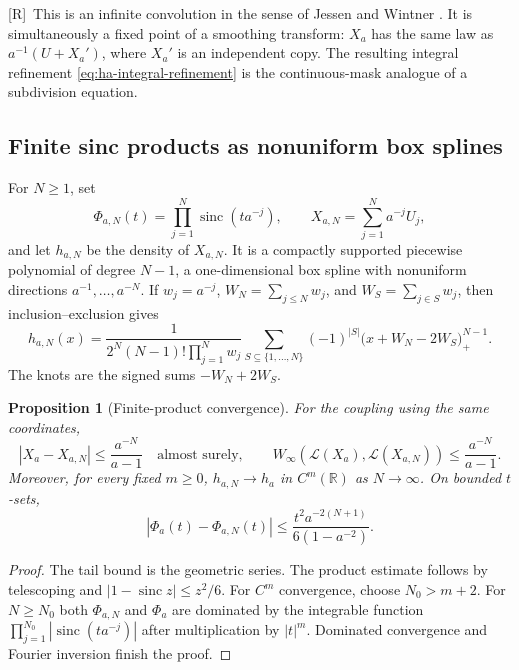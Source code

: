 \documentclass[11pt,oneside]{article}
\newtheorem{proposition}[theorem]{Proposition}
\theoremstyle{definition}
\theoremstyle{remark}
\newcommand{\R}{\mathbb R}
\newcommand{\sinc}{\operatorname{sinc}}
\newcommand{\Wass}{W_{\infty}}
\newcommand{\Rmark}{\textcolor{sourceblue}{\textsf{[R]}}}
\begin{document}
\Rmark\ This is an infinite convolution in the sense of Jessen and Wintner
\cite{jessen1935}.  It is simultaneously a fixed point of a smoothing transform: $X_a$ has
the same law as $a^{-1}(U+X_a')$, where $X_a'$ is an independent copy.  The resulting
integral refinement \eqref{eq:ha-integral-refinement} is the continuous-mask analogue of a
subdivision equation.

\subsection{Finite sinc products as nonuniform box splines}

For $N\ge1$, set
\begin{equation}
 \Phi_{a,N}(t)=\prod_{j=1}^{N}\sinc(ta^{-j}),
 \qquad
 X_{a,N}=\sum_{j=1}^{N}a^{-j}U_j,
 \label{eq:finite-products}
\end{equation}
and let $h_{a,N}$ be the density of $X_{a,N}$.  It is a compactly supported piecewise
polynomial of degree $N-1$, a one-dimensional box spline with nonuniform directions
$a^{-1},\ldots,a^{-N}$.  If $w_j=a^{-j}$, $W_N=\sum_{j\le N}w_j$, and
$W_S=\sum_{j\in S}w_j$, then inclusion--exclusion gives
\begin{equation}
 h_{a,N}(x)=\frac1{2^N(N-1)!\prod_{j=1}^{N}w_j}
 \sum_{S\subseteq\{1,\ldots,N\}}(-1)^{|S|}
 \bigl(x+W_N-2W_S\bigr)_+^{N-1}.
 \label{eq:finite-box-spline}
\end{equation}
The knots are the signed sums $-W_N+2W_S$.

\begin{proposition}[Finite-product convergence]
\label{prop:finite-convergence}
For the coupling using the same coordinates,
\begin{equation}
 |X_a-X_{a,N}|\le\frac{a^{-N}}{a-1}
 \quad\text{almost surely},
 \qquad
 \Wass(\mathcal L(X_a),\mathcal L(X_{a,N}))
 \le\frac{a^{-N}}{a-1}.
 \label{eq:Wasserstein-finite}
\end{equation}
Moreover, for every fixed $m\ge0$, $h_{a,N}\to h_a$ in $C^m(\R)$ as $N\to\infty$.
On bounded $t$-sets,
\begin{equation}
 |\Phi_a(t)-\Phi_{a,N}(t)|
 \le \frac{t^2a^{-2(N+1)}}{6(1-a^{-2})}.
 \label{eq:finite-product-rate}
\end{equation}
\end{proposition}

\begin{proof}
The tail bound is the geometric series.  The product estimate follows by telescoping and
$|1-\sinc z|\le z^2/6$.  For $C^m$ convergence, choose $N_0>m+2$.  For $N\ge N_0$ both
$\Phi_{a,N}$ and $\Phi_a$ are dominated by the integrable function
$\prod_{j=1}^{N_0}|\sinc(ta^{-j})|$ after multiplication by $|t|^m$.  Dominated convergence
and Fourier inversion finish the proof.
\end{proof}
\end{document}
